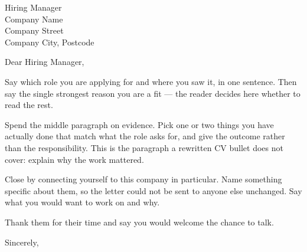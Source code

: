\documentclass[11pt,a4paper]{letter}
\begin{document}
\begin{letter}{%
    Hiring Manager \\
    Company Name \\
    Company Street \\
    Company City, Postcode
}

\opening{Dear Hiring Manager,}

Say which role you are applying for and where you saw it, in one
sentence. Then say the single strongest reason you are a fit --- the
reader decides here whether to read the rest.

Spend the middle paragraph on evidence. Pick one or two things you have
actually done that match what the role asks for, and give the outcome
rather than the responsibility. This is the paragraph a rewritten CV
bullet does not cover: explain why the work mattered.

Close by connecting yourself to this company in particular. Name
something specific about them, so the letter could not be sent to anyone
else unchanged. Say what you would want to work on and why.

Thank them for their time and say you would welcome the chance to talk.

\closing{Sincerely,}

\end{letter}
\end{document}
